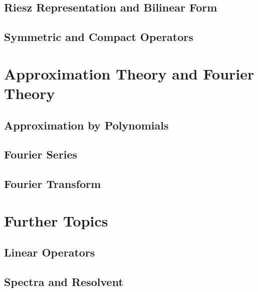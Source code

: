 \documentclass[a4paper, 12pt]{article}
\begin{document}
\subsection{Riesz Representation and Bilinear Form}


\subsection{Symmetric and Compact Operators}


\newpage
\section{Approximation Theory and Fourier Theory}

\subsection{Approximation by Polynomials}


\subsection{Fourier Series}


\subsection{Fourier Transform}


\newpage
\section{Further Topics}
\subsection{Linear Operators}


\subsection{Spectra and Resolvent}

\end{document}
